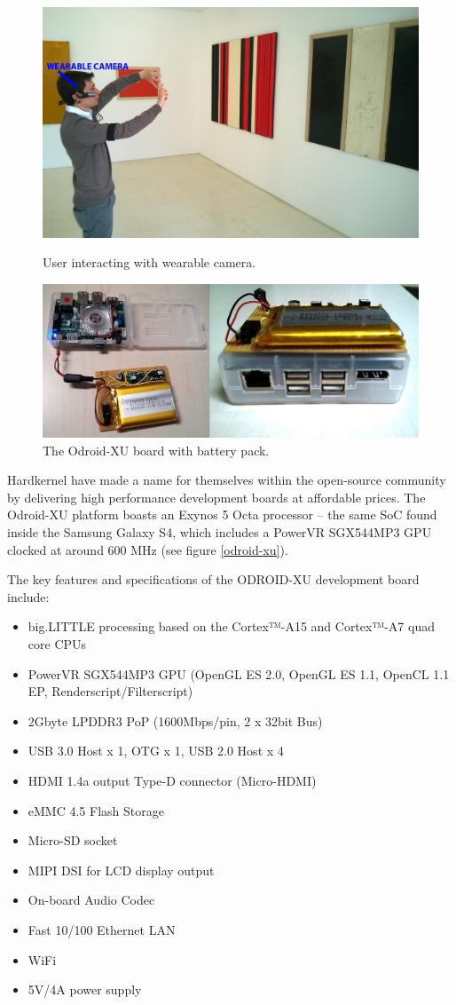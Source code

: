 \begin{figure}[t!]
\centering
\includegraphics[width=0.5\linewidth]{Figures/lore_maramotti.jpg}
\caption{User interacting with wearable camera.}
\includegraphics[width=0.5\linewidth]{Figures/board.jpg}

\caption{The Odroid-XU board with battery pack.}
\label{board}
\end{figure}

Hardkernel have made a name for themselves within the open-source community by delivering high performance development boards at affordable prices. The Odroid-XU platform boasts an Exynos 5 Octa processor – the same SoC found inside the Samsung Galaxy S4, which includes a PowerVR SGX544MP3 GPU clocked at around 600 MHz (see figure \ref{odroid-xu}).

The key features and specifications of the ODROID-XU development board include:
\begin{itemize}
\item big.LITTLE processing based on the Cortex™-A15 and Cortex™-A7 quad core CPUs
\item PowerVR SGX544MP3 GPU (OpenGL ES 2.0, OpenGL ES 1.1, OpenCL 1.1 EP, Renderscript/Filterscript)
\item 2Gbyte LPDDR3 PoP (1600Mbps/pin, 2 x 32bit Bus)
\item USB 3.0 Host x 1, OTG x 1, USB 2.0 Host x 4
\item HDMI 1.4a output Type-D connector (Micro-HDMI)
\item eMMC 4.5 Flash Storage
\item Micro-SD socket
\item MIPI DSI for LCD display output
\item On-board Audio Codec
\item Fast 10/100 Ethernet LAN
\item WiFi
\item 5V/4A power supply
\end{itemize}

